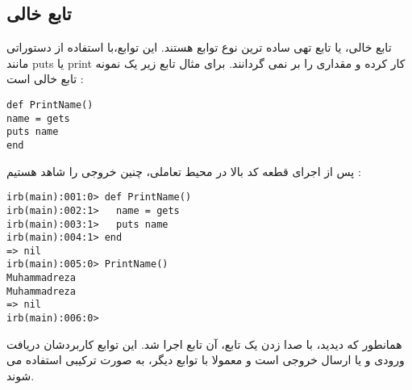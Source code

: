 \documentclass[11pt]{article}
\begin{document}
\subsection{تابع خالی}
تابع خالی، یا تابع تهی
ساده ترین نوع توابع هستند. این توابع،با استفاده از دستوراتی مانند puts یا print کار کرده و مقداری را بر نمی گردانند. برای مثال تابع زیر یک نمونه تابع خالی است :
\begin{latin}
\begin{verbatim}
def PrintName()
name = gets
puts name
end
\end{verbatim}
\end{latin}
پس از اجرای قطعه کد بالا در محیط تعاملی، چنین خروجی را شاهد هستیم :
\begin{latin}
\begin{verbatim}
irb(main):001:0> def PrintName()
irb(main):002:1>   name = gets
irb(main):003:1>   puts name
irb(main):004:1> end
=> nil
irb(main):005:0> PrintName()
Muhammadreza
Muhammadreza
=> nil
irb(main):006:0> 
\end{verbatim}
\end{latin}
همانطور که دیدید، با صدا زدن
یک تابع، آن تابع اجرا شد. این توابع کاربردشان دریافت ورودی و یا ارسال خروجی است و معمولا با توابع دیگر، به صورت ترکیبی استفاده می شوند. 
\end{document}
